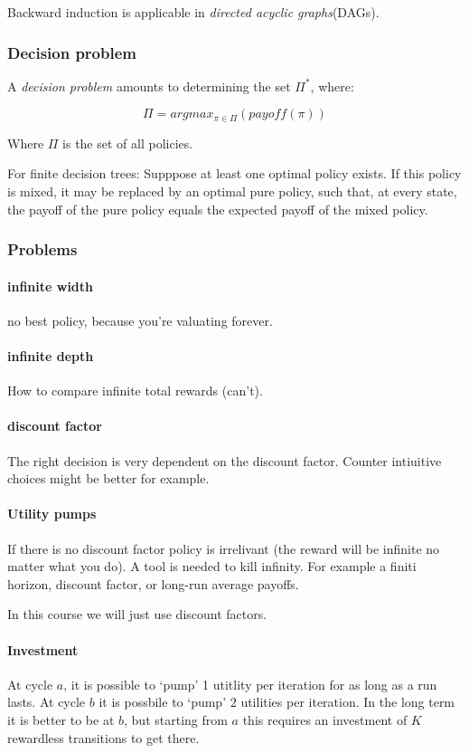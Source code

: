 \documentclass{article}
\begin{document}
Backward induction is applicable in \emph{directed acyclic graphs}(DAGs).

\subsubsection{Decision problem}
A \emph{decision problem} amounts to determining the set $\Pi^*$, where:

\[ \Pi = argmax_{\pi \in \Pi}(payoff(\pi))\]

Where $\Pi$ is the set of all policies.

For finite decision trees: Supppose at least one optimal policy exists.
If this policy is mixed, it may be replaced by an optimal pure policy,
such that, at every state, the payoff of the pure policy equals the expected
payoff of the mixed policy.

\subsubsection{Problems}
\paragraph{infinite width} no best policy, because you're valuating forever.
\paragraph{infinite depth} How to compare infinite total rewards (can't).
\paragraph{discount factor} The right decision is very dependent on the
discount factor. Counter intiuitive choices might be better for example.

\paragraph{Utility pumps}
If there is no discount factor policy is irrelivant (the reward will be
infinite no matter what you do). A tool is needed to kill infinity.
For example a finiti horizon, discount factor, or long-run average
payoffs.

In this course we will just use discount factors.

\paragraph{Investment} 
At cycle $a$, it is possible to `pump' 1 utitlity per iteration for as
long as a run lasts. At cycle $b$ it is possbile to `pump' $2$ utilities
per iteration.
In the long term it is better to be at $b$, but starting from $a$ this
requires an investment of $K$ rewardless transitions to get there.
\end{document}
